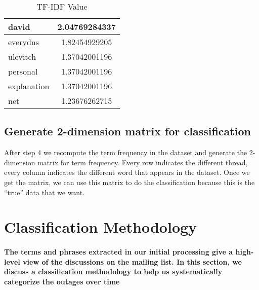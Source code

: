 \documentclass{sig-alternate}
\begin{document}
\begin{table}
\centering
\begin{tabular}{ | l || c | }
  \hline
  david & 2.04769284337  \\
  \hline
  everydns & 1.82454929205  \\
  \hline
  ulevitch & 1.37042001196  \\
  \hline
  personal & 1.37042001196  \\
  \hline
  explanation & 1.37042001196  \\
  \hline
  net & 1.23676262715  \\
  \hline
\end{tabular}
\caption{TF-IDF Value}\label{table:tf-idf}
\end{table}

\subsection{Generate 2-dimension matrix for classification}
After step 4 we recompute the term frequency in the dataset and generate the 2-dimension matrix for term frequency. Every row indicates the different thread, every column indicates the different word that appears in the dataset. Once we get the matrix, we can use this matrix to do the classification because this is the “true” data that we want.

\section{Classification Methodology}
\paragraph{The terms and phrases extracted in our initial processing give a high-level view of the discussions on the mailing list. In this section, we discuss a classification methodology to help us systematically categorize the outages over time}
\end{document}
